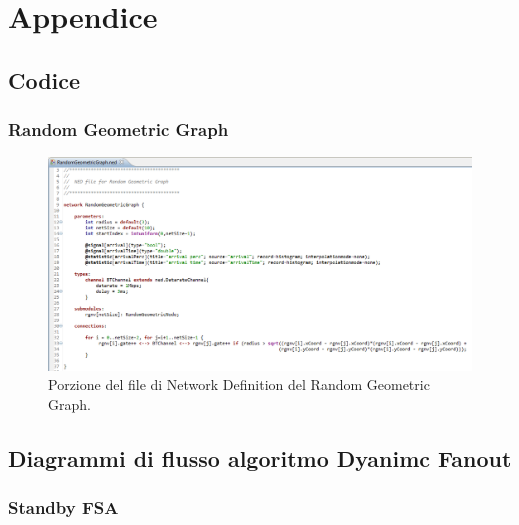 \chapter{Appendice}
\label{apx:appendice}

\section{Codice}
\subsection{Random Geometric Graph}
\label{apx:rgg_code}

\begin{figure}[h]
	\centering
	\includegraphics[width=0.68\textheight, angle=90]{Images/omnet/codice_rgg}
	\caption[Codice RGG]{Porzione del file di Network Definition del Random Geometric Graph.}
	\label{fig:rgg_code}
\end{figure}
\newpage


\section{Diagrammi di flusso algoritmo Dyanimc Fanout}
\label{apx:diagrammi_fsa}

\subsection{Standby FSA}
\label{apx:stb_fsa}

